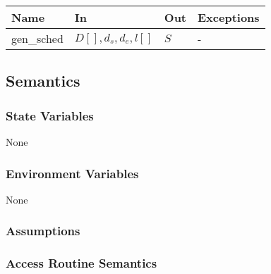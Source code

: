 \documentclass[12pt, titlepage]{article}
\begin{document}
\begin{center}
\begin{tabular}{p{2cm} p{4cm} p{4cm} p{2cm}}
\hline
\textbf{Name} & \textbf{In} & \textbf{Out} & \textbf{Exceptions} \\
\hline
gen\_sched & $D[], d_s, d_e, l[]$ & $S$ & - \\
\hline
\end{tabular}
\end{center}

\subsection{Semantics}

\subsubsection{State Variables}

None

\subsubsection{Environment Variables}

None

\subsubsection{Assumptions}


\subsubsection{Access Routine Semantics}
\end{document}
